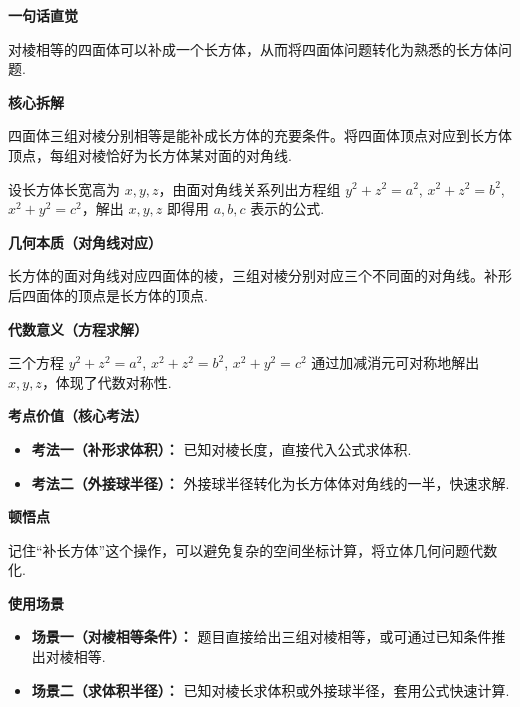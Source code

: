 \begin{explanationbox}

	\textbf{\textcolor{CExplanation}{一句话直觉}}

	对棱相等的四面体可以补成一个长方体，从而将四面体问题转化为熟悉的长方体问题.

	\medskip
	\textbf{\textcolor{CExplanation}{核心拆解}}
	\begin{description}[style=nextline, leftmargin=2.8em, labelsep=0.5em, itemsep=0.45em]
		\item[\textbf{要点一（补形条件）：}] 四面体三组对棱分别相等是能补成长方体的充要条件。将四面体顶点对应到长方体顶点，每组对棱恰好为长方体某对面的对角线.
		\item[\textbf{要点二（关系推导）：}] 设长方体长宽高为 $x,y,z$，由面对角线关系列出方程组 $y^2+z^2=a^2$, $x^2+z^2=b^2$, $x^2+y^2=c^2$，解出 $x,y,z$ 即得用 $a,b,c$ 表示的公式.
	\end{description}

	\medskip
	\textbf{\textcolor{CExplanation}{几何本质（对角线对应）}}

	长方体的面对角线对应四面体的棱，三组对棱分别对应三个不同面的对角线。补形后四面体的顶点是长方体的顶点.

	\medskip
	\textbf{\textcolor{CExplanation}{代数意义（方程求解）}}

	三个方程 $y^2+z^2=a^2$, $x^2+z^2=b^2$, $x^2+y^2=c^2$ 通过加减消元可对称地解出 $x,y,z$，体现了代数对称性.

	\medskip
	\textbf{\textcolor{CExplanation}{考点价值（核心考法）}}
	\begin{itemize}[leftmargin=*, itemsep=0.5em, topsep=0.4em]
		\item \textbf{考法一（补形求体积）：} 已知对棱长度，直接代入公式求体积.
		\item \textbf{考法二（外接球半径）：} 外接球半径转化为长方体体对角线的一半，快速求解.
	\end{itemize}

	\medskip
	\textbf{\textcolor{CExplanation}{顿悟点}}

	记住“补长方体”这个操作，可以避免复杂的空间坐标计算，将立体几何问题代数化.

	\medskip
	\textbf{\textcolor{CExplanation}{使用场景}}
	\begin{itemize}[leftmargin=*, itemsep=0.5em, topsep=0.4em]
		\item \textbf{场景一（对棱相等条件）：} 题目直接给出三组对棱相等，或可通过已知条件推出对棱相等.
		\item \textbf{场景二（求体积半径）：} 已知对棱长求体积或外接球半径，套用公式快速计算.
	\end{itemize}

\end{explanationbox}
